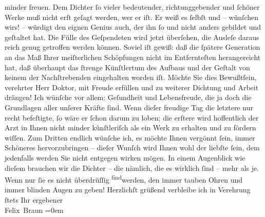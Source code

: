 \begin{ledgroupsized}[t]{13cm}
               minder freuen.\pend
           \pstart
           {\pb}Dem Dichter ſo vieler bedeutender, richtunggebender
               und ſchöner Werke muß nicht erſt geſagt werden, wer er iſt. Er weiß es ſelbſt und –
               wünſchen wirs! – würdigt den eignen Genius auch, der ihn ſo und nicht anders gebildet
               und geſtaltet hat. Die Fülle des Geſpendeten wird jetzt überſehen, die Ausleſe daraus
               reich genug getroffen werden können. Soviel iſt gewiß: daß die ſpätere Generation an
               das Maß Ihrer meiſterlichen Schöpfungen nicht im Entfernteſten herangereicht hat, daß
               überhaupt das ſtrenge Künſtlertum des Aufbaus und der Geſtalt von keinem der
               Nachſtrebenden eingehalten worden iſt. Möchte Sie dies Bewußtſein, verehrter Herr
               Doktor, mit Freude erfüllen und zu weiterer Dichtung und Arbeit drängen!\pend
           \pstart
           Ich wünſche vor allem: Geſundheit und Lebensfreude, die ja doch die Grundlagen aller
               unſerer Kräfte ſind. Wenn dieſer freudige {\pb}Tag die
               letztere nur recht befeſtigte, ſo wäre er ſchon darum zu loben; die erſtere wird
               hoffentlich der Arzt in Ihnen nicht minder künſtleriſch als ein Werk zu erhalten und
               zu fördern wiſſen. Zum Dritten endlich wünſche ich, es möchte Ihnen vergönnt ſein,
               immer Schöneres hervorzubringen – dieſer Wunſch wird Ihnen wohl der liebſte ſein, dem
               jedenfalls werden Sie nicht entgegen wirken mögen. In einem Augenblick wie dieſem
               brauchen wir die Dichter – die nämlich, die es wirklich ſind – mehr als je. Wenn nur
               ſie es nicht überdrüſſig \substVorne{}\textsuperscript{ſind}\substDazwischen{}werden\substHinten{}, den immer tauben Ohren und immer blinden Augen zu geben!\pend
           \pstart
           Herzlichſt grüßend verbleibe ich in Verehrung ſtets Ihr ergebener{\\[\baselineskip]}\spacefill\mbox{Felix Braun}\pend
           \leftskip=0em{}
         
         \endnumbering{}\end{ledgroupsized}  \newcommand{\dateiname}{L02381}\newcommand{\titel}{Felix Braun an Arthur Schnitzler, 13. 5. 1922}\newcommand{\editorInnen}{Martin Anton Müller und Gerd-Hermann Susen}
      